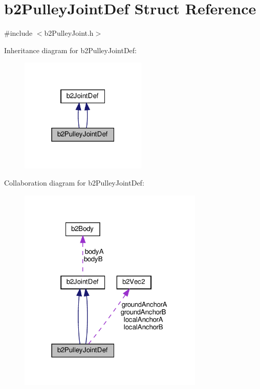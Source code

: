\hypertarget{structb2PulleyJointDef}{}\section{b2\+Pulley\+Joint\+Def Struct Reference}
\label{structb2PulleyJointDef}


{\ttfamily \#include $<$b2\+Pulley\+Joint.\+h$>$}



Inheritance diagram for b2\+Pulley\+Joint\+Def\+:
\nopagebreak
\begin{figure}[H]
\begin{center}
\leavevmode
\includegraphics[width=171pt]{structb2PulleyJointDef__inherit__graph}
\end{center}
\end{figure}


Collaboration diagram for b2\+Pulley\+Joint\+Def\+:
\nopagebreak
\begin{figure}[H]
\begin{center}
\leavevmode
\includegraphics[width=250pt]{structb2PulleyJointDef__coll__graph}
\end{center}
\end{figure}
